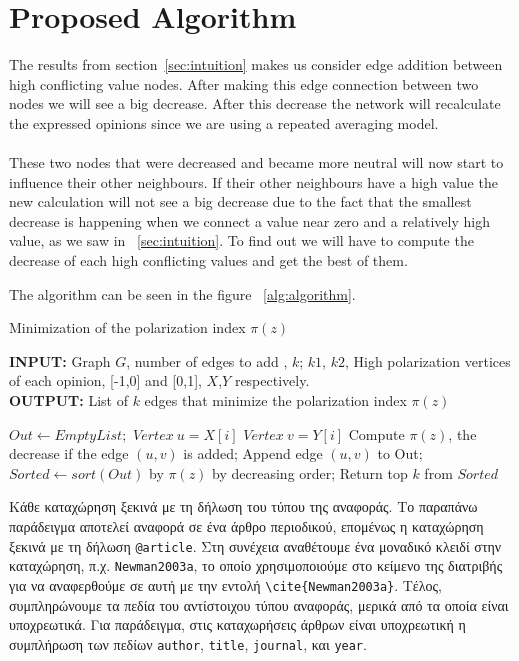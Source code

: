 \section{Proposed Algorithm}
\label{sec:proposedAlgorithm}

The results from section~\ref{sec:intuition} makes us consider edge addition between high conflicting value nodes. After making this edge connection between two nodes we will see a big decrease. After this decrease the network will recalculate the expressed opinions since we are using a repeated averaging model. 
\\
\\
These two nodes that were decreased and became more neutral will now start to influence their other neighbours. If their other neighbours have a high value the new calculation will not see a big decrease due to the fact that the smallest decrease is happening when we connect a value near zero and a relatively high value, as we saw in ~\ref{sec:intuition}. To find out we will have to compute the decrease of each high conflicting values and get the best of them. 

The algorithm can be seen in the figure ~\ref{alg:algorithm}.

\begin{algorithm}[t]
	\caption{Minimization of the polarization index $\pi(z)$}
	\label{alg:algorithm}
	\begin{flushleft}
        		\textbf{INPUT:} Graph $G$, number of edges to add , $k$; $k1$, $k2$, High polarization vertices of each opinion, [-1,0] and [0,1], $X$,$Y$ respectively.\\
        		\textbf{OUTPUT:} List of $k$ edges that minimize the polarization index $\pi(z)$
	\end{flushleft}
	\begin{algorithmic}[1]
		\STATE $Out \leftarrow Empty List;$
		\STATE $Vertex \ u = X[i]$
		\STATE $Vertex \ v = Y[i]$
		\STATE Compute $\pi(z)$, the decrease if the edge $(u,v)$ is added;
		\STATE Append edge $(u,v)$ to Out;
		\ENDFOR
		\ENDFOR
		\STATE $Sorted \leftarrow sort(Out)$ by $\pi(z)$ by decreasing order;
		\STATE Return top $k$ from $Sorted$
	\end{algorithmic}
\end{algorithm}




Κάθε καταχώρηση ξεκινά με τη δήλωση του τύπου της αναφοράς.
Το παραπάνω παράδειγμα αποτελεί αναφορά σε ένα άρθρο περιοδικού, επομένως η καταχώρηση ξεκινά με τη δήλωση \verb|@article|.
Στη συνέχεια αναθέτουμε ένα μοναδικό κλειδί στην καταχώρηση, π.χ. \verb|Newman2003a|, το οποίο χρησιμοποιούμε στο κείμενο της διατριβής για να αναφερθούμε σε αυτή με την εντολή \verb|\cite{Newman2003a}|.
Τέλος, συμπληρώνουμε τα πεδία του αντίστοιχου τύπου αναφοράς, μερικά από τα οποία είναι υποχρεωτικά.
Για παράδειγμα, στις καταχωρήσεις άρθρων είναι υποχρεωτική η συμπλήρωση των πεδίων \verb|author|, \verb|title|, \verb|journal|, και \verb|year|.

